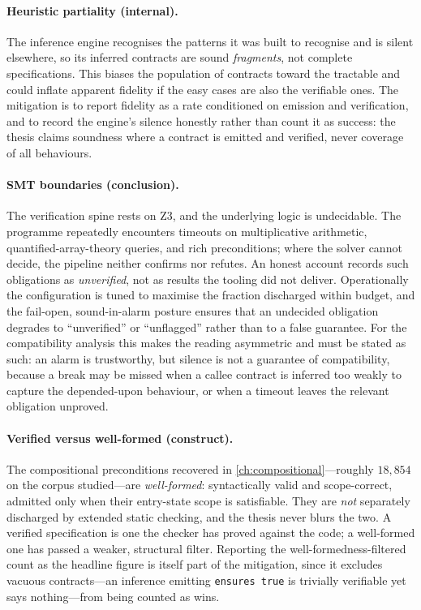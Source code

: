 \paragraph{Heuristic partiality (internal).} The inference engine recognises the
patterns it was built to recognise and is silent elsewhere, so its inferred
contracts are sound \emph{fragments}, not complete specifications. This biases the
population of contracts toward the tractable and could inflate apparent fidelity if
the easy cases are also the verifiable ones. The mitigation is to report fidelity as
a rate conditioned on emission and verification, and to record the engine's silence
honestly rather than count it as success: the thesis claims soundness where a
contract is emitted and verified, never coverage of all behaviours.

\paragraph{SMT boundaries (conclusion).} The verification spine rests on Z3, and
the underlying logic is undecidable. The programme repeatedly encounters timeouts on
multiplicative arithmetic, quantified-array-theory queries, and rich preconditions;
where the solver cannot decide, the pipeline neither confirms nor refutes. An honest
account records such obligations as \emph{unverified}, not as results the tooling
did not deliver. Operationally the configuration is tuned to maximise the fraction
discharged within budget, and the fail-open, sound-in-alarm posture ensures that an
undecided obligation degrades to ``unverified'' or ``unflagged'' rather than to a
false guarantee. For the compatibility analysis this makes the reading asymmetric
and must be stated as such: an alarm is trustworthy, but silence is not a guarantee
of compatibility, because a break may be missed when a callee contract is inferred
too weakly to capture the depended-upon behaviour, or when a timeout leaves the
relevant obligation unproved.

\paragraph{Verified versus well-formed (construct).} The compositional preconditions
recovered in \cref{ch:compositional}---roughly $18{,}854$ on the corpus
studied---are \emph{well-formed}: syntactically
valid and scope-correct, admitted only when their entry-state scope is satisfiable.
They are \emph{not} separately discharged by extended static checking, and the thesis
never blurs the two. A verified specification is one the checker has proved against
the code; a well-formed one has passed a weaker, structural filter. Reporting the
well-formedness-filtered count as the headline figure is itself part of the
mitigation, since it excludes vacuous contracts---an inference emitting
\texttt{ensures true} is trivially verifiable yet says nothing---from being counted
as wins.

